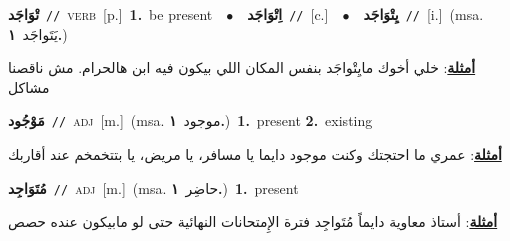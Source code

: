 \documentclass[10pt,a4paper,twoside]{article} %
\begin{document}
\begin{multicols}{2}
{\setlength\topsep{0pt}\textbf{\foreignlanguage{arabic}{تْوَاجَد}}\ {\color{gray}\texttt{//}\color{black}}\ \textsc{verb}\ [p.]\ \textbf{1.}~be present\ \ $\bullet$\ \ \setlength\topsep{0pt}\textbf{\foreignlanguage{arabic}{اِتْوَاجَد}}\ {\color{gray}\texttt{//}\color{black}}\ [c.]\ \ $\bullet$\ \ \setlength\topsep{0pt}\textbf{\foreignlanguage{arabic}{يِتْوَاجَد}}\ {\color{gray}\texttt{//}\color{black}}\ [i.]\ \color{gray}(msa. \foreignlanguage{arabic}{يَتَواجَد}~\foreignlanguage{arabic}{\textbf{١.}})\color{black}\  \begin{flushright}\color{gray}\foreignlanguage{arabic}{\textbf{\underline{\foreignlanguage{arabic}{أمثلة}}}: خلي أخوك مايِتْواجَد بنفس المكان اللي بيكون فيه ابن هالحرام. مش ناقصنا مشاكل}\end{flushright}\color{black}} \vspace{2mm}

{\setlength\topsep{0pt}\textbf{\foreignlanguage{arabic}{مَوْجُود}}\ {\color{gray}\texttt{//}\color{black}}\ \textsc{adj}\ [m.]\ \color{gray}(msa. \foreignlanguage{arabic}{موجود}~\foreignlanguage{arabic}{\textbf{١.}})\color{black}\ \textbf{1.}~present  \textbf{2.}~existing\  \begin{flushright}\color{gray}\foreignlanguage{arabic}{\textbf{\underline{\foreignlanguage{arabic}{أمثلة}}}: عمري ما احتجتك وكنت موجود دايما يا مسافر، يا مريض، يا بتتخمخم عند أقاربك}\end{flushright}\color{black}} \vspace{2mm}

{\setlength\topsep{0pt}\textbf{\foreignlanguage{arabic}{مُتَوَاجِد}}\ {\color{gray}\texttt{//}\color{black}}\ \textsc{adj}\ [m.]\ \color{gray}(msa. \foreignlanguage{arabic}{حاضِر}~\foreignlanguage{arabic}{\textbf{١.}})\color{black}\ \textbf{1.}~present\  \begin{flushright}\color{gray}\foreignlanguage{arabic}{\textbf{\underline{\foreignlanguage{arabic}{أمثلة}}}: أستاذ معاوية دايماً مُتَواجِد فترة الإِمتحانات النهائية حتى لو مابيكون عنده حصص}\end{flushright}\color{black}} \vspace{2mm}


\end{multicols}
\end{document}
